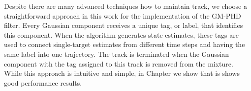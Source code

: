 Despite there are many advanced techniques how to maintain track, we choose a straightforward approach in this work for the implementation of the GM-PHD filter. Every Gaussian component receives a unique tag, or label, that identifies this component. When the algorithm generates state estimates, these tags are used to connect single-target estimates from different time steps and having the same label into one trajectory. The track is terminated when the Gaussian component with the tag assigned to this track is removed from the mixture. While this approach is intuitive and simple, in Chapter  we show that is shows good performance results.
